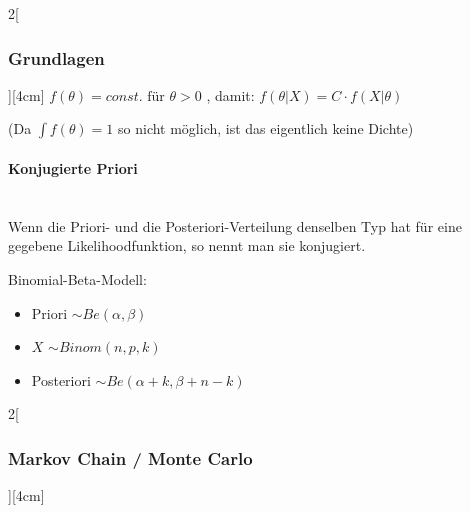 \documentclass[8pt]{extarticle}
\begin{document}
\begin{multicols}{2}[\subsubsection{Grundlagen}][4cm]
$f(\theta)=const. \text{ für } \theta > 0$
,  damit:
 $f(\theta | X) = C \cdot f(X | \theta )$

\noindent (Da $\int f(\theta) =1$ so nicht möglich, ist das eigentlich keine Dichte)

\paragraph{Konjugierte Priori}

\begin{Extensiv}
~\\
  \noindent Wenn die Priori- und die Posteriori-Verteilung denselben Typ hat für eine gegebene Likelihoodfunktion, so nennt man sie konjugiert.
  
\end{Extensiv}

\vspace{1 em}
\noindent Binomial-Beta-Modell: \begin{itemize}
  \vspace{-0.7 em}
\setlength\itemsep{-0.7 em}
\item Priori $ \sim Be(\alpha,\beta)$
\item $X$ $ \sim Binom(n,p,k)$
\item Posteriori $\sim Be(\alpha + k, \beta + n - k)$
  
\end{itemize}

\end{multicols}


\begin{multicols}{2}[\subsubsection{Markov Chain / Monte Carlo}][4cm]



\end{multicols}
\end{document}
